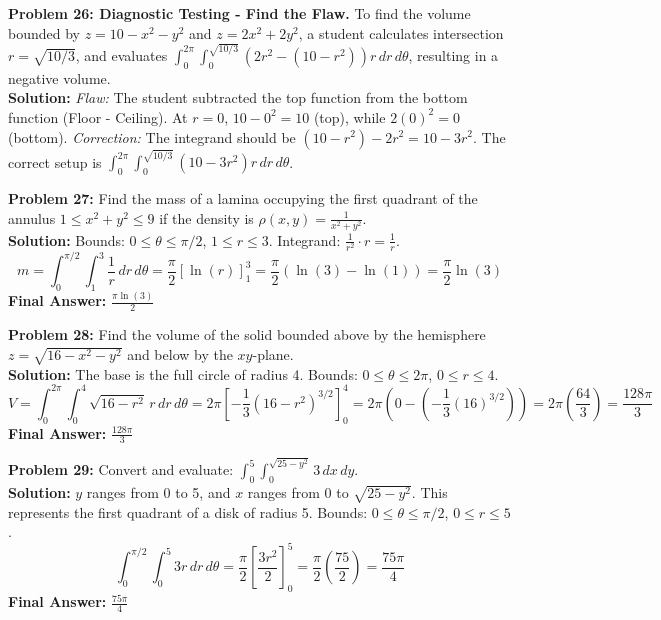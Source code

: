 \documentclass[11pt]{article}
\begin{document}
\vspace{0.5cm}
\textbf{Problem 26: Diagnostic Testing - Find the Flaw.} To find the volume bounded by $z=10-x^2-y^2$ and $z=2x^2+2y^2$, a student calculates intersection $r=\sqrt{10/3}$, and evaluates $\int_0^{2\pi} \int_0^{\sqrt{10/3}} \left(2r^2 - (10-r^2)\right) r \, dr \, d\theta$, resulting in a negative volume.
\\
\textbf{Solution:}
\textit{Flaw:} The student subtracted the top function from the bottom function (Floor - Ceiling). At $r=0$, $10-0^2=10$ (top), while $2(0)^2=0$ (bottom).
\textit{Correction:} The integrand should be $(10-r^2) - 2r^2 = 10-3r^2$. The correct setup is $\int_0^{2\pi} \int_0^{\sqrt{10/3}} (10-3r^2)r \, dr \, d\theta$.

\vspace{0.5cm}
\textbf{Problem 27:} Find the mass of a lamina occupying the first quadrant of the annulus $1 \le x^2+y^2 \le 9$ if the density is $\rho(x,y) = \frac{1}{x^2+y^2}$.
\\
\textbf{Solution:}
Bounds: $0 \le \theta \le \pi/2$, $1 \le r \le 3$.
Integrand: $\frac{1}{r^2} \cdot r = \frac{1}{r}$.
$$ m = \int_0^{\pi/2} \int_1^3 \frac{1}{r} \, dr \, d\theta = \frac{\pi}{2} \left[ \ln(r) \right]_1^3 = \frac{\pi}{2}(\ln(3) - \ln(1)) = \frac{\pi}{2}\ln(3) $$
\textbf{Final Answer:} $\frac{\pi\ln(3)}{2}$

\vspace{0.5cm}
\textbf{Problem 28:} Find the volume of the solid bounded above by the hemisphere $z = \sqrt{16-x^2-y^2}$ and below by the $xy$-plane.
\\
\textbf{Solution:}
The base is the full circle of radius 4. Bounds: $0 \le \theta \le 2\pi$, $0 \le r \le 4$.
$$ V = \int_0^{2\pi} \int_0^4 \sqrt{16-r^2} \, r \, dr \, d\theta = 2\pi \left[ -\frac{1}{3}(16-r^2)^{3/2} \right]_0^4 = 2\pi \left( 0 - \left(-\frac{1}{3}(16)^{3/2}\right) \right) = 2\pi \left( \frac{64}{3} \right) = \frac{128\pi}{3} $$
\textbf{Final Answer:} $\frac{128\pi}{3}$

\vspace{0.5cm}
\textbf{Problem 29:} Convert and evaluate: $\int_0^5 \int_0^{\sqrt{25-y^2}} 3 \, dx \, dy$.
\\
\textbf{Solution:}
$y$ ranges from 0 to 5, and $x$ ranges from 0 to $\sqrt{25-y^2}$. This represents the first quadrant of a disk of radius 5.
Bounds: $0 \le \theta \le \pi/2$, $0 \le r \le 5$.
$$ \int_0^{\pi/2} \int_0^5 3r \, dr \, d\theta = \frac{\pi}{2} \left[ \frac{3r^2}{2} \right]_0^5 = \frac{\pi}{2} \left( \frac{75}{2} \right) = \frac{75\pi}{4} $$
\textbf{Final Answer:} $\frac{75\pi}{4}$
\end{document}
